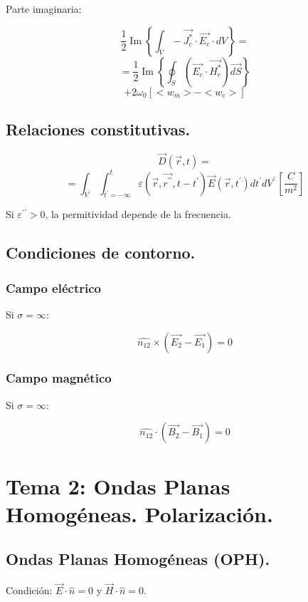 \documentclass[12pt,a4paper]{article}
\begin{document}
Parte imaginaria:

\[ \frac{1}{2} \operatorname{Im}\left\{ \int_V - \vec{J_{c}^*} \cdot
\vec{E_c} \cdot dV \right\} = \]
\[ = \frac{1}{2} \operatorname{Im}\left\{ \oint_S \left(\vec{E_{c}} \cdot
\vec{H_c^*} \right) \vec{dS} \right\} \] 
\[ +2\omega_0 [<w_m>-<w_e>] \]

\subsection{Relaciones constitutivas.}

\[ \vec{D} (\vec{r}, t) = \]
\[ = \int_{V^{\prime}} \int_{t^{\prime}=-\infty}^{t}
\varepsilon (\vec{r}, \vec{r^{\prime\prime}}, t-t^{\prime})
\vec{E} (\vec{r}, t^{\prime}) dt^{\prime} dV^{\prime}
\, \left[\frac{C}{m^2} \right] \]

Si $ \varepsilon^{\prime\prime} > 0 $, la permitividad depende de la
frecuencia.

\subsection{Condiciones de contorno.}

\subsubsection{Campo eléctrico}

Si $ \sigma = \infty $:

\[ \hat{n_{12}} \times ( \vec{E_2} - \vec{E_1} ) = 0 \]

\subsubsection{Campo magnético}

Si $ \sigma = \infty $:

\[ \hat{n_{12}} \cdot ( \vec{B_2} - \vec{B_1} ) = 0 \]


\section{Tema 2: Ondas Planas Homogéneas. Polarización.}

\subsection{Ondas Planas Homogéneas (OPH).}

Condición: $ \vec{E} \cdot \hat{n} = 0 $ y $ \vec{H} \cdot \hat{n} = 0 $.
\end{document}

